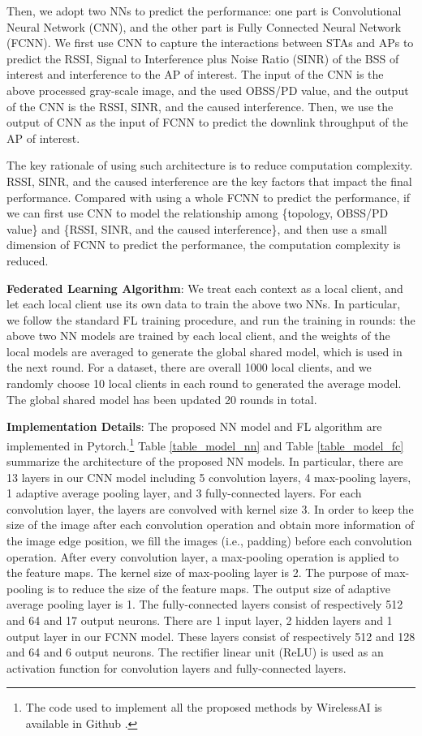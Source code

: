 \documentclass[10pt, journal, letterpaper]{IEEEtran}
\begin{document}
Then, we adopt two NNs to predict the performance: one part is Convolutional Neural Network (CNN), and the other part is Fully Connected Neural Network (FCNN). We first use CNN to capture the interactions between STAs and APs to predict the RSSI, Signal to Interference plus Noise Ratio (SINR) of the BSS of interest and interference to the AP of interest. The input of the CNN is the above processed gray-scale image, and the used OBSS/PD value, and the output of the CNN is the RSSI, SINR, and the caused interference. Then, we use the output of CNN as the input of FCNN to predict the downlink throughput of the AP of interest. 

The key rationale of using such architecture is to reduce computation complexity. RSSI, SINR, and the caused interference are the key factors that impact the final performance. Compared with using a whole FCNN to predict the performance, if we can first use CNN to model the relationship among \{topology, OBSS/PD value\} and \{RSSI, SINR, and the caused interference\}, and then use a small dimension of FCNN to predict the performance, the computation complexity is reduced.


{\bf Federated Learning Algorithm}: We treat each context as a local client, and let each local client use its own data to train the above two NNs. In particular, we follow the standard FL training procedure, and run the training in rounds: the above two NN models are trained by each local client, and the weights of the local models are averaged to generate the global shared model, which is used in the next round. For a dataset, there are overall 1000 local clients, and we randomly choose 10 local clients in each round to generated the average model. The global shared model has been updated 20 rounds in total.

{\bf Implementation Details}: The proposed NN model and FL algorithm are implemented in Pytorch.\footnote{The code used to implement all the proposed methods by WirelessAI is available in Github \cite{wirelessai-codes}.} Table \ref{table_model_nn} and Table \ref{table_model_fc} summarize the architecture of the proposed NN models. In particular, there are 13 layers in our CNN model including 5 convolution layers, 4 max-pooling layers, 1 adaptive average pooling layer, and 3 fully-connected layers. For each convolution layer, the layers are convolved with kernel size 3. In order to keep the size of the image after each convolution operation and obtain more information of the image edge position, we fill the images (i.e., padding) before each convolution operation. After every convolution layer, a max-pooling operation is applied to the feature maps. The kernel size of max-pooling layer is 2. The purpose of max-pooling is to reduce the size of the feature maps. The output size of adaptive average pooling layer is 1. The fully-connected layers consist of respectively 512 and 64 and 17 output neurons. There are 1 input layer, 2 hidden layers and 1 output layer in our FCNN model. These layers consist of respectively 512 and 128 and 64 and 6 output neurons. The rectifier linear unit (ReLU) is used as an activation function for convolution layers and fully-connected layers.
\end{document}

